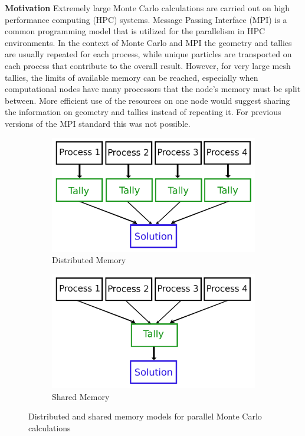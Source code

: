\documentclass{beamer}
\begin{document}
\begin{frame}[t,fragile]{}
\begin{columns}[t,totalwidth=\textwidth]
\begin{column}{0.3\textwidth}
\begin{block}{\LARGE\textbf{Motivation}}
Extremely large Monte Carlo calculations are carried out on high performance computing (HPC) systems.
Message Passing Interface (MPI) is a common programming model that is utilized for the parallelism
in HPC environments.
In the context of Monte Carlo and MPI the geometry and tallies are usually repeated for each process,
while unique particles are transported on each process that contribute to the overall result.
However, for very large mesh tallies, the limits of available memory can be reached, especially
when computational nodes have many processors that the node's memory must be split between.
More efficient use of the resources on one node would suggest sharing the information on geometry
and tallies instead of repeating it.
For previous versions of the MPI standard this was not possible.
\begin{figure}
\begin{subfigure}[b]{0.49\textwidth}
\includegraphics[width=\textwidth]{Distributed.png}
\caption{Distributed Memory}
\end{subfigure}
\begin{subfigure}[b]{0.49\textwidth}
\includegraphics[width=\textwidth]{Shared.png}
\caption{Shared Memory}
\end{subfigure}
\caption{Distributed and shared memory models for parallel Monte Carlo calculations}
\end{figure}


\end{block}
\end{column}
\end{columns}
\end{frame}
\end{document}
